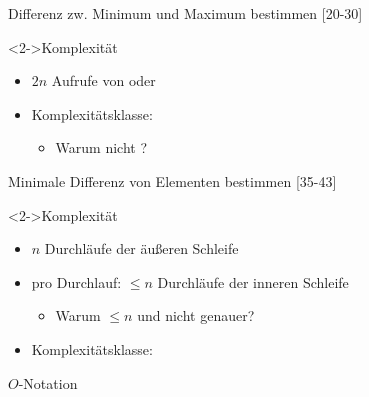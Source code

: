 \begin{frame}
    \begin{exblock}{Differenz zw. Minimum und Maximum bestimmen}
        [20-30]
    \end{exblock}
    \begin{block}<2->{Komplexität}
        \begin{itemize}
            \item $2n$ Aufrufe von  oder 
            \item Komplexitätsklasse: \olin
            \begin{itemize}
                \item \alert{Warum nicht ?}
            \end{itemize}
        \end{itemize}
    \end{block}
\end{frame}

\begin{frame}
    \begin{exblock}{Minimale Differenz von Elementen bestimmen}
        [35-43]
    \end{exblock}
    \begin{block}<2->{Komplexität}
        \begin{itemize}
            \item $n$ Durchläufe der äußeren Schleife
            \item pro Durchlauf: $\leq n$ Durchläufe der inneren Schleife
            \begin{itemize}
                \item \alert{Warum $\leq n$ und nicht genauer?}
            \end{itemize}
            \item Komplexitätsklasse: \osquare
        \end{itemize}
    \end{block}
\end{frame}
    
\begin{frame}
    \begin{defblock}{$O$-Notation}
    \end{defblock}
\end{frame}
